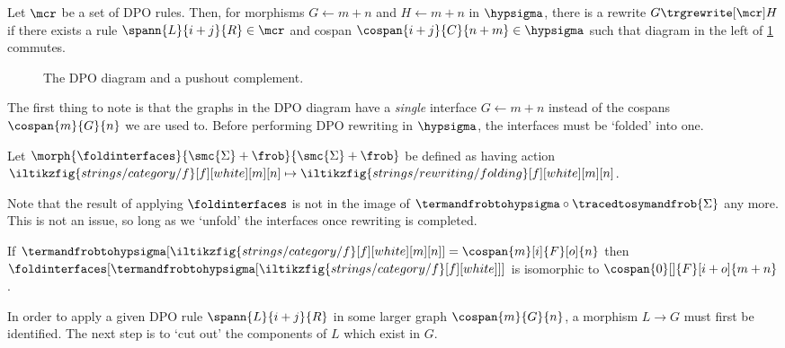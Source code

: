 \begin{definition}\label{def:dpo}
    Let \(\mcr\) be a set of DPO rules.
    Then, for morphisms \(G \leftarrow m+n\) and \(H \leftarrow m+n\) in
    \(\hypsigma\), there is a rewrite \(G \trgrewrite[\mcr] H\) if there
    exists a rule \(
        \spann{L}{i+j}{R} \in \mcr
    \) and cospan \(
        \cospan{i+j}{C}{n+m} \in \hypsigma
    \) such that diagram in the left of \cref{fig:dpo} commutes.
\end{definition}

\begin{figure}
    \centering
    \raisebox{1em}{}
    \qquad
    
    \caption{The DPO diagram and a pushout complement.}
    \label{fig:dpo}
\end{figure}

The first thing to note is that the graphs in the DPO diagram have a
\emph{single} interface \(G \leftarrow m + n\) instead of the cospans \(
    \cospan{m}{G}{n}
\) we are used to.
Before performing DPO rewriting in \(\hypsigma\), the interfaces must be
`folded' into one.

\begin{definition}
    Let \(\morph{\foldinterfaces}{\smc{\Sigma} + \frob}{\smc{\Sigma} + \frob}\)
    be defined as having action \(
        \iltikzfig{strings/category/f}[f][white][m][n]
        \mapsto
        \iltikzfig{strings/rewriting/folding}[f][white][m][n]
    \).
\end{definition}

Note that the result of applying \(\foldinterfaces\) is not in the image of \(
    \termandfrobtohypsigma \circ \tracedtosymandfrob{\Sigma}
\) any more.
This is not an issue, so long as we `unfold' the interfaces once rewriting is
completed.

\begin{proposition}
    If \(
        \termandfrobtohypsigma[\iltikzfig{strings/category/f}[f][white][m][n]]
        =
        \cospan{m}[i]{F}[o]{n}
    \) then \(
        \foldinterfaces[
            \termandfrobtohypsigma[\iltikzfig{strings/category/f}[f][white]]
        ]
    \) is isomorphic to \(
        \cospan{0}[]{F}[i+o]{m+n}
    \).
\end{proposition}

In order to apply a given DPO rule \(\spann{L}{i+j}{R}\) in some larger
graph \(\cospan{m}{G}{n}\), a morphism \(L \to G\) must first be identified.
The next step is to `cut out' the components of \(L\) which exist in \(G\).

